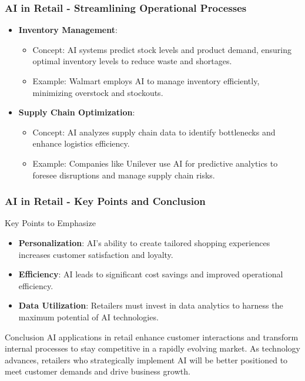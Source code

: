 \documentclass{beamer}
\begin{document}
\begin{frame}[fragile]
    \frametitle{AI in Retail - Streamlining Operational Processes}
    \begin{itemize}
        \item \textbf{Inventory Management}:
            \begin{itemize}
                \item Concept: AI systems predict stock levels and product demand, ensuring optimal inventory levels to reduce waste and shortages.
                \item Example: Walmart employs AI to manage inventory efficiently, minimizing overstock and stockouts.
            \end{itemize}
        \item \textbf{Supply Chain Optimization}:
            \begin{itemize}
                \item Concept: AI analyzes supply chain data to identify bottlenecks and enhance logistics efficiency.
                \item Example: Companies like Unilever use AI for predictive analytics to foresee disruptions and manage supply chain risks.
            \end{itemize}
    \end{itemize}
\end{frame}

\begin{frame}[fragile]
    \frametitle{AI in Retail - Key Points and Conclusion}
    \begin{block}{Key Points to Emphasize}
        \begin{itemize}
            \item \textbf{Personalization}: AI's ability to create tailored shopping experiences increases customer satisfaction and loyalty.
            \item \textbf{Efficiency}: AI leads to significant cost savings and improved operational efficiency.
            \item \textbf{Data Utilization}: Retailers must invest in data analytics to harness the maximum potential of AI technologies.
        \end{itemize}
    \end{block}
    \begin{block}{Conclusion}
        AI applications in retail enhance customer interactions and transform internal processes to stay competitive in a rapidly evolving market. 
        As technology advances, retailers who strategically implement AI will be better positioned to meet customer demands and drive business growth.
    \end{block}
\end{frame}
\end{document}
